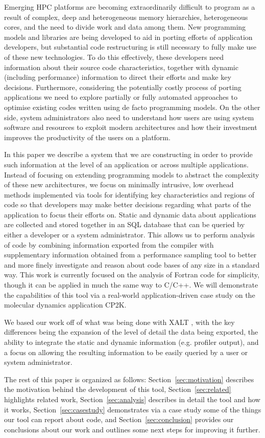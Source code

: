 Emerging HPC platforms are becoming extraordinarily difficult to program as a result of complex, deep and heterogeneous memory hierarchies, heterogeneous cores, and the need to divide work and data among them.
New programming models and libraries are being developed to aid in porting efforts of application developers, but substantial code restructuring is still necessary to fully make use of these new technologies.
To do this effectively, these developers need information about their source code characteristics, together with dynamic (including performance) information to direct their efforts and make key decisions.
Furthermore, considering the potentially costly process of porting applications we need to explore partially or fully automated approaches to optimise existing codes written using de facto programming models.
On the other side, system administrators also need to understand how users are using system software and resources to exploit modern architectures and how their investment improves the productivity of the users on a platform.

In this paper we describe a system that we are constructing in order to provide such information at the level of an application or across multiple applications.
Instead of focusing on extending programming models to abstract the complexity of these new architectures, we focus on minimally intrusive, low overhead methods implemented via tools for identifying key characteristics and regions of code so that developers may make better decisions regarding what parts of the application to focus their efforts on.
Static and dynamic data about applications are collected and stored together in an \acs{SQL} database that can be queried by either a developer or a system administrator.
This allows us to perform analysis of code by combining information exported from the compiler with supplementary information obtained from a performance sampling tool to better and more finely investigate  and reason about code bases of any size in a standard way.
This work is currently focused on the analysis of Fortran code for simplicity, though it can be applied in much the same way to C/C++.
We will demonstrate the capabilities of this tool via a real-world application-driven case study on the molecular dynamics application CP2K.

We based our work off of what was being done with XALT \cite{7081224}, with the key differences being the expansion of the level of detail the data being exported, the ability to integrate the static and dynamic information (e.g. profiler output), and a focus on allowing the resulting information to be easily queried by a user or system administrator.

The rest of this paper is organized as follows: Section~\ref{sec:motivation} describes the motivation behind the development of this tool, Section~\ref{sec:related} highlights related work, Section~\ref{sec:analysis} describes in detail the tool and how it works, Section~\ref{sec:casestudy} demonstrates via a case study some of the things our tool can report about code, and Section~\ref{sec:conclusion} provides our conclusions about our work and outlines some next steps for improving it further.
